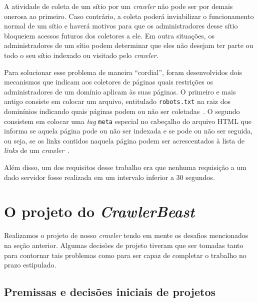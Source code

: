 \documentclass[10pt,twocolumn]{article}
\begin{document}
A atividade de coleta de um sítio por um \emph{crawler} não pode ser por
demais onerosa ao primeiro. Caso contrário, a coleta poderá inviabilizar
o funcionamento normal de um sítio e haverá motivos para que os
administradores desse sítio bloqueiem acessos futuros dos coletores a
ele. Em outra situações, os administradores de um sítio podem determinar
que eles não desejam ter parte ou todo o seu sítio indexado ou visitado
pelo \emph{crawler}.

Para solucionar esse problema de maneira ``cordial'', foram
desenvolvidos dois mecanismos que indicam aos coletores de páginas quais
restrições os administradores de um domínio aplicam às suas páginas. O
primeiro e mais antigo consiste em colocar um arquivo, entitulado
\texttt{robots.txt} na raiz dos dominínios indicando quais páginas podem
ou não ser coletadas~\cite{robotstxt}. O segundo consistem em colocar
uma \emph{tag} \texttt{meta} especial no cabeçalho do arquivo HTML que
informa se aquela página pode ou não ser indexada e se pode ou não ser
seguida, ou seja, se os links contidos naquela página podem ser
acrescentados à lista de \emph{links} de um
\emph{crawler}~\cite{robotsmeta}.

Além disso, um dos requisitos desse trabalho era que nenhuma requisição
a um dado servidor fosse realizada em um intervalo inferior a 30 segundos.





\section{O projeto do \emph{CrawlerBeast}}

Realizamos o projeto de nosso \emph{crawler} tendo em mente os desafios
mencionados na seção anterior. Algumas decisões de projeto tiveram que
ser tomadas tanto para contornar tais problemas como para ser capaz de
completar o trabalho no prazo estipulado.

\subsection{Premissas e decisões iniciais de projetos}
\end{document}
